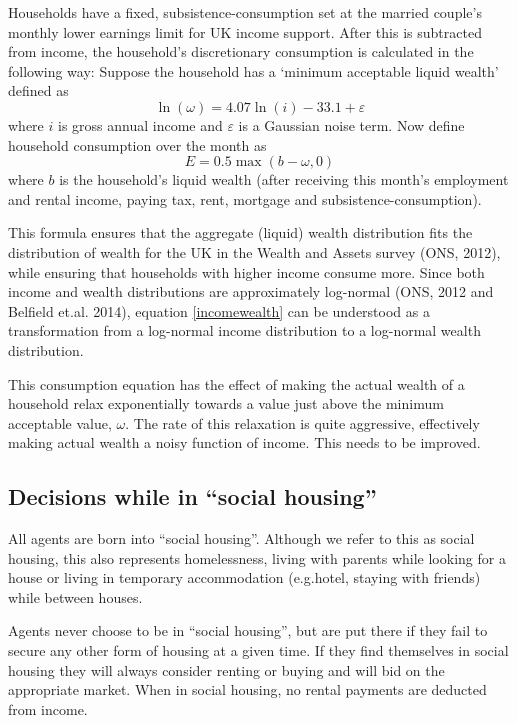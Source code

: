 \documentclass{report}
\begin{document}
Households have a fixed, subsistence-consumption set at the married couple's monthly lower earnings limit for UK income support. After this is subtracted from income, the household's discretionary consumption is calculated in the following way: Suppose the household has a `minimum acceptable liquid wealth' defined as
\begin{equation}
\ln(\omega) = 4.07\ln (i)-33.1+\varepsilon
\label{incomewealth}
\end{equation}
where $i$ is gross annual income and $\varepsilon$ is a Gaussian noise term. 
Now define household consumption over the month as
\begin{equation}
E=0.5 \max \left( b-\omega,0\right)
\label{consumption}
\end{equation}
where $b$ is the household's liquid wealth (after receiving this month's employment and rental income, paying tax, rent, mortgage and subsistence-consumption).

This formula ensures that the aggregate (liquid) wealth distribution fits the distribution of wealth for the UK in the Wealth and Assets survey (ONS, 2012), while ensuring that households with higher income consume more. Since both income and wealth distributions are approximately log-normal (ONS, 2012 and Belfield et.al. 2014), equation \ref{incomewealth} can be understood as a transformation from a log-normal income distribution to a log-normal wealth distribution.

This consumption equation has the effect of making the actual wealth of a household relax exponentially towards a value just above the minimum acceptable value, $\omega$. The rate of this relaxation is quite aggressive, effectively making actual wealth a noisy function of income. This needs to be improved.

\subsection{Decisions while in ``social housing''}
All agents are born into ``social housing''. Although we refer to this as social housing, this also represents homelessness, living with parents while looking for a house or living in temporary accommodation (e.g.hotel, staying with friends) while between houses.

Agents never choose to be in ``social housing'', but are put there if they fail to secure any other form of housing at a given time. If they find themselves in social housing they will always consider renting or buying and will bid on the appropriate market. When in social housing, no rental payments are deducted from income.
\end{document}
